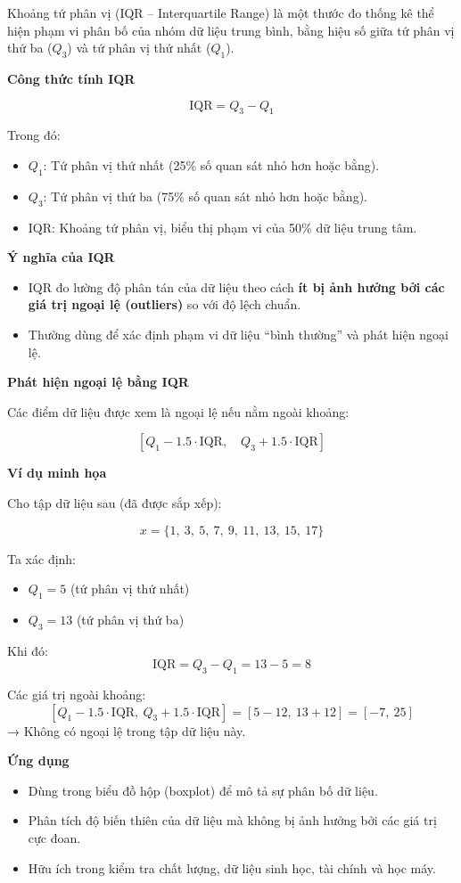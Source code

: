Khoảng tứ phân vị (IQR – Interquartile Range) là một thước đo thống kê thể hiện phạm vi phân bố của nhóm dữ liệu trung bình, bằng hiệu số giữa tứ phân vị thứ ba (\(Q_3\)) và tứ phân vị thứ nhất (\(Q_1\)).

\textbf{Công thức tính IQR}

\begin{equation}
    \text{IQR} = Q_3 - Q_1
    \label{eq:iqr}
\end{equation}

\noindent Trong đó:
\begin{itemize}
    \item \( Q_1 \): Tứ phân vị thứ nhất (25\% số quan sát nhỏ hơn hoặc bằng).
    \item \( Q_3 \): Tứ phân vị thứ ba (75\% số quan sát nhỏ hơn hoặc bằng).
    \item \( \text{IQR} \): Khoảng tứ phân vị, biểu thị phạm vi của 50\% dữ liệu trung tâm.
\end{itemize}

\textbf{Ý nghĩa của IQR}

\begin{itemize}
    \item IQR đo lường độ phân tán của dữ liệu theo cách \textbf{ít bị ảnh hưởng bởi các giá trị ngoại lệ (outliers)} so với độ lệch chuẩn.
    \item Thường dùng để xác định phạm vi dữ liệu “bình thường” và phát hiện ngoại lệ.
\end{itemize}

\textbf{Phát hiện ngoại lệ bằng IQR}

Các điểm dữ liệu được xem là ngoại lệ nếu nằm ngoài khoảng:

\[
[Q_1 - 1.5 \cdot \text{IQR},\quad Q_3 + 1.5 \cdot \text{IQR}]
\]

\textbf{Ví dụ minh họa}

Cho tập dữ liệu sau (đã được sắp xếp):

\[
x = \{1,\ 3,\ 5,\ 7,\ 9,\ 11,\ 13,\ 15,\ 17\}
\]

Ta xác định:

\begin{itemize}
    \item \( Q_1 = 5 \) (tứ phân vị thứ nhất)
    \item \( Q_3 = 13 \) (tứ phân vị thứ ba)
\end{itemize}

\noindent Khi đó:
\[
\text{IQR} = Q_3 - Q_1 = 13 - 5 = 8
\]

\noindent Các giá trị ngoài khoảng:
\[
[Q_1 - 1.5 \cdot \text{IQR},\ Q_3 + 1.5 \cdot \text{IQR}] = [5 - 12,\ 13 + 12] = [-7,\ 25]
\]
→ Không có ngoại lệ trong tập dữ liệu này.

\textbf{Ứng dụng}

\begin{itemize}
    \item Dùng trong biểu đồ hộp (boxplot) để mô tả sự phân bố dữ liệu.
    \item Phân tích độ biến thiên của dữ liệu mà không bị ảnh hưởng bởi các giá trị cực đoan.
    \item Hữu ích trong kiểm tra chất lượng, dữ liệu sinh học, tài chính và học máy.
\end{itemize}
